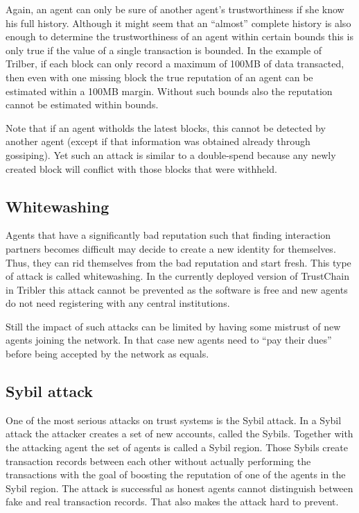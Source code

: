 Again, an agent can only be sure of another agent's trustworthiness if she know his full history. 
Although it might seem that an ``almost'' complete history is also enough to determine the trustworthiness
of an agent within certain bounds this is only true if the value of a single transaction is bounded.
In the example of Trilber, if each block can only record a maximum of 100MB of data transacted, then 
even with one missing block the true reputation of an agent can be estimated within a 100MB margin.
Without such bounds also the reputation cannot be estimated within bounds. 

Note that if an agent witholds the latest blocks, this cannot be detected by another agent (except
if that information was obtained already through gossiping). Yet such an attack is similar to a
double-spend because any newly created block will conflict with those blocks that were withheld.

\subsection{Whitewashing}
Agents that have a significantly bad reputation such that finding interaction partners becomes difficult may decide to create a new 
identity for themselves. Thus, they can rid themselves from the bad reputation and start fresh. This 
type of attack is called whitewashing. In the currently deployed version of TrustChain in Tribler 
this attack cannot be prevented as the software is free and new agents do not need registering with
any central institutions.

Still the impact of such attacks can be limited by having some mistrust of new agents joining the 
network. In that case new agents need to ``pay their dues'' before being accepted by the network 
as equals. 

\subsection{Sybil attack}
One of the most serious attacks on trust systems is the Sybil attack. In a Sybil attack the attacker
creates a set of new accounts, called the Sybils. Together with the attacking agent the set of 
agents is called a Sybil region. Those Sybils create transaction records 
between each other without actually performing the transactions with the goal of boosting the 
reputation of one of the agents in the Sybil region. The attack is successful as honest agents 
cannot distinguish between fake and real transaction records. That also makes the attack hard to 
prevent.

